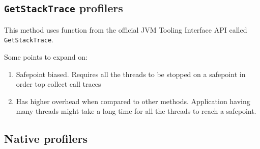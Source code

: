 \documentclass[..thesis.tex]{subfiles}
\begin{document}
\subsection{\texttt{GetStackTrace} profilers}
This method uses function from the official JVM Tooling Interface API \cite{jvmti_doc} called \texttt{GetStackTrace}.

Some points to expand on:
\begin{enumerate}
	\item Safepoint biased. Requires all the threads to be stopped on a safepoint in order top collect call traces
	\item Has higher overhead when compared to other methods. Application having many threads might take a long time for all the threads to reach a safepoint.
\end{enumerate}

\subsection{Native profilers}
\end{document}
